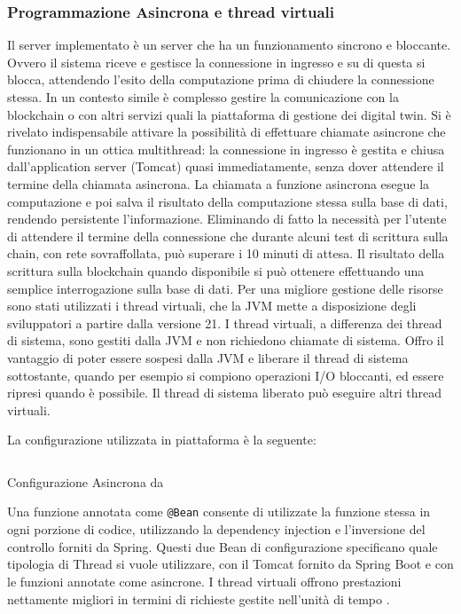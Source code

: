 \documentclass[a4paper,11pt]{article}
\newenvironment{longlisting}{\captionsetup{type=figure}}{}
\begin{document}
\subsubsection{Programmazione Asincrona e thread virtuali}
Il server implementato è un server che ha un funzionamento sincrono e bloccante. Ovvero il sistema riceve e gestisce la connessione in ingresso e su di questa si blocca, attendendo l'esito della computazione prima di chiudere la connessione stessa. In un contesto simile è complesso gestire la comunicazione con la blockchain o con altri servizi quali la piattaforma di gestione dei digital twin. Si è rivelato indispensabile attivare la possibilità di effettuare chiamate asincrone che funzionano in un ottica multithread: la connessione in ingresso è gestita e chiusa dall'application server (Tomcat) quasi immediatamente, senza dover attendere il termine della chiamata asincrona. La chiamata a funzione asincrona esegue la computazione e poi salva il risultato della computazione stessa sulla base di dati, rendendo persistente l'informazione. Eliminando di fatto la necessità per l'utente di attendere il termine della connessione che durante alcuni test di scrittura sulla chain, con rete sovraffollata, può superare i 10 minuti di attesa. Il risultato della scrittura sulla blockchain quando disponibile si può ottenere effettuando una semplice interrogazione sulla base di dati. Per una migliore gestione delle risorse sono stati utilizzati i thread virtuali, che la JVM mette a disposizione degli sviluppatori a partire dalla versione 21. I thread virtuali, a differenza dei thread di sistema, sono gestiti dalla JVM e non richiedono chiamate di sistema. Offro il vantaggio di poter essere sospesi dalla JVM e liberare il thread di sistema sottostante,  quando per esempio si compiono operazioni I/O bloccanti, ed essere ripresi quando è possibile. Il thread di sistema liberato può eseguire altri thread virtuali. \cite{oraclevirtualthread}

La configurazione utilizzata in piattaforma è la seguente:


\begin{longlisting}
  \inputminted{java}{./code/async.spring.java}
  \caption{Configurazione Asincrona da \cite{baeldungWorkingWith}}
  \label{listing:asyncconfig}
\end{longlisting}

Una funzione annotata come \texttt{@Bean} consente di utilizzate la funzione stessa in ogni porzione di codice, utilizzando la dependency injection e l'inversione del controllo forniti da Spring.
Questi due Bean di configurazione specificano quale tipologia di Thread si vuole utilizzare, con il Tomcat fornito da Spring Boot e con le funzioni annotate come asincrone.
I thread virtuali offrono prestazioni nettamente migliori in termini di richieste gestite nell'unità di tempo \cite{baeldungWorkingWith}.
\end{document}
